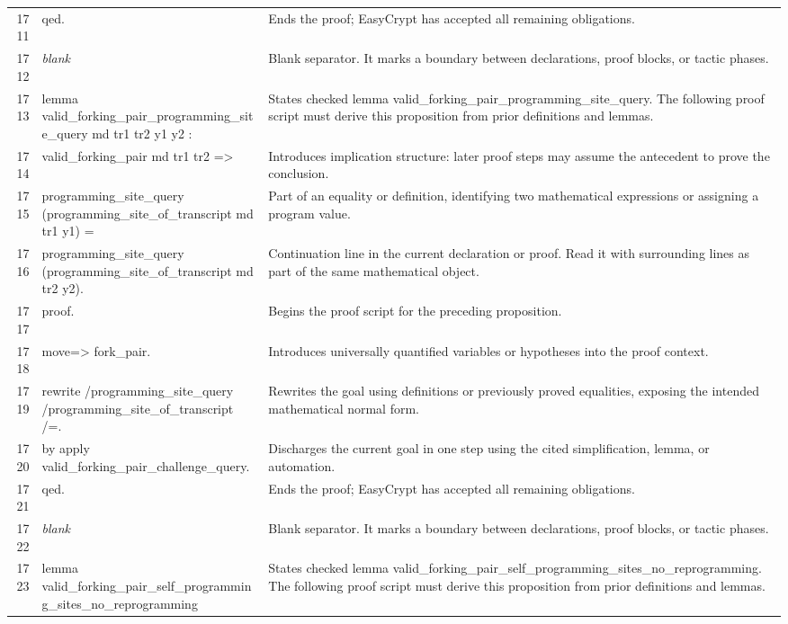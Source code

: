 \documentclass[10pt]{article}
\begin{document}
\begin{longtable}{r L{0.53\textwidth} L{0.37\textwidth}}
1711 & {\ttfamily\scriptsize qed.} & Ends the proof; EasyCrypt has accepted all remaining obligations. \\
1712 & {\ttfamily\scriptsize \emph{blank}} & Blank separator.  It marks a boundary between declarations, proof blocks, or tactic phases. \\
1713 & {\ttfamily\scriptsize lemma valid\_forking\_pair\_programming\_site\_query md tr1 tr2 y1 y2 :} & States checked lemma valid\_forking\_pair\_programming\_site\_query.  The following proof script must derive this proposition from prior definitions and lemmas. \\
1714 & {\ttfamily\scriptsize   valid\_forking\_pair md tr1 tr2 =>} & Introduces implication structure: later proof steps may assume the antecedent to prove the conclusion. \\
1715 & {\ttfamily\scriptsize   programming\_site\_query (programming\_site\_of\_transcript md tr1 y1) =} & Part of an equality or definition, identifying two mathematical expressions or assigning a program value. \\
1716 & {\ttfamily\scriptsize   programming\_site\_query (programming\_site\_of\_transcript md tr2 y2).} & Continuation line in the current declaration or proof.  Read it with surrounding lines as part of the same mathematical object. \\
1717 & {\ttfamily\scriptsize proof.} & Begins the proof script for the preceding proposition. \\
1718 & {\ttfamily\scriptsize move=> fork\_pair.} & Introduces universally quantified variables or hypotheses into the proof context. \\
1719 & {\ttfamily\scriptsize rewrite /programming\_site\_query /programming\_site\_of\_transcript /=.} & Rewrites the goal using definitions or previously proved equalities, exposing the intended mathematical normal form. \\
1720 & {\ttfamily\scriptsize by apply valid\_forking\_pair\_challenge\_query.} & Discharges the current goal in one step using the cited simplification, lemma, or automation. \\
1721 & {\ttfamily\scriptsize qed.} & Ends the proof; EasyCrypt has accepted all remaining obligations. \\
1722 & {\ttfamily\scriptsize \emph{blank}} & Blank separator.  It marks a boundary between declarations, proof blocks, or tactic phases. \\
1723 & {\ttfamily\scriptsize lemma valid\_forking\_pair\_self\_programming\_sites\_no\_reprogramming} & States checked lemma valid\_forking\_pair\_self\_programming\_sites\_no\_reprogramming.  The following proof script must derive this proposition from prior definitions and lemmas. \\

\end{longtable}
\end{document}
